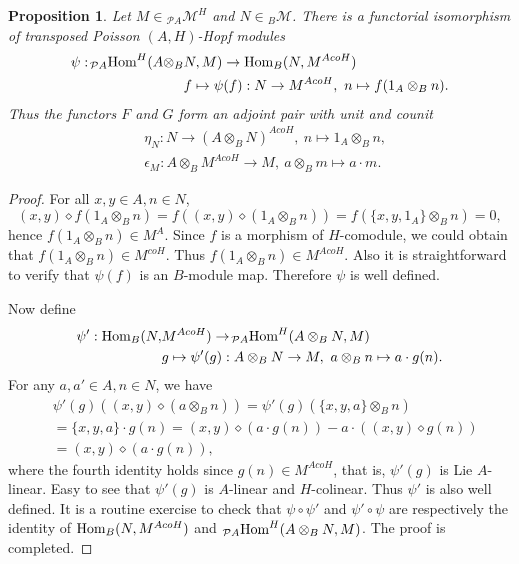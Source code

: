 \documentclass[11pt]{article}
\newtheorem{proposition}[theorem]{Proposition}
\def\di{\diamond}
\def\ot{\otimes}
\begin{document}
\begin{proposition}\label{pro:3f}
Let $M\in\! _{\mathcal{P}A}\mathcal{M}^H$ and $N\in\! _B\mathcal{M}$. There is a functorial isomorphism of transposed Poisson $(A, H)$-Hopf modules
\begin{align*}
\psi:\! _{\mathcal{P}A}\textup{Hom}^H(A\ot_B&N,M)\rightarrow \textup{Hom}_B(N,M^{AcoH})\\
&f\mapsto\psi(f):N\rightarrow M^{AcoH},\ n\mapsto f(1_A\ot_B n).
\end{align*}
Thus the functors $F$ and $G$ form an adjoint pair with unit and counit
\begin{align*}
&\eta_N:N\rightarrow (A\ot_BN)^{AcoH},\ n\mapsto 1_A\ot_B n,\\
&\epsilon_M:A\ot_B M^{AcoH}\rightarrow M,\ a\ot_B m\mapsto a\cdot m.
\end{align*}
\end{proposition}

\begin{proof}
For all $x,y\in A,n\in N$,
$$(x,y)\di f(1_A\ot_Bn)=f((x,y)\di(1_A\ot_Bn))=f(\{x,y,1_A\}\ot_Bn)=0,$$
hence $f(1_A\ot_Bn)\in M^{A}$. Since $f$ is a morphism of $H$-comodule, we could obtain that $f(1_A\ot_Bn)\in M^{coH}$. Thus $f(1_A\ot_Bn)\in M^{AcoH}$. Also it is straightforward to verify that $\psi(f)$ is an $B$-module map.  Therefore $\psi$ is well defined. 

Now define
\begin{align*}
\psi':\textup{Hom}_B(N,&M^{AcoH})\rightarrow\! _{\mathcal{P}A}\textup{Hom}^H(A\ot_BN,M)\\
&g\mapsto\psi'(g):A\ot_B N\rightarrow M,\ a\ot_B n\mapsto a\cdot g(n).
\end{align*}
For any $a,a'\in A,n\in N$, we have
\begin{align*}
&\psi'(g)((x,y)\di(a\ot_B n))=\psi'(g)(\{x,y,a\}\ot_B n)\\
&=\{x,y,a\}\cdot g(n)=(x,y)\di(a\cdot g(n))-a\cdot((x,y)\di g(n))\\
&=(x,y)\di(a\cdot g(n)),
\end{align*}
where the fourth identity holds since $g(n)\in M^{AcoH}$, that is, $\psi'(g)$ is Lie $A$-linear. Easy to see that $\psi'(g)$ is $A$-linear and $H$-colinear. Thus $\psi'$ is also well defined. It is a routine exercise to check that $\psi\circ\psi'$ and $\psi'\circ\psi$ are respectively the identity of $\textup{Hom}_B(N,M^{AcoH})$ and $_{\mathcal{P}A}\textup{Hom}^H(A\ot_BN,M)$. The proof is completed.
\end{proof}
\end{document}
